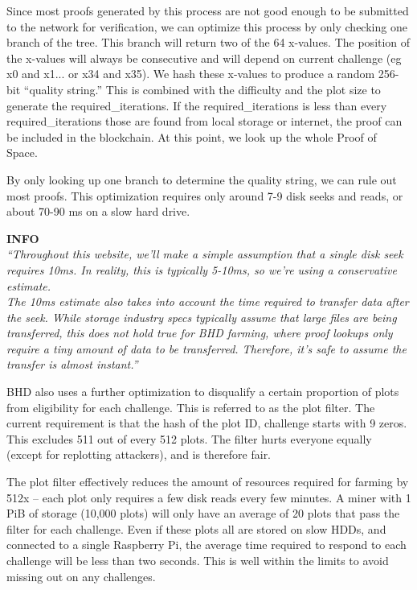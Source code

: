 \begin{flushleft}
    Since most proofs generated by this process are not good enough to be submitted to the network for verification, we can optimize this process by only checking one branch of the tree. This branch will return two of the 64 x-values. The position of the x-values will always be consecutive and will depend on current challenge (eg x0 and x1... or x34 and x35). We hash these x-values to produce a random 256-bit ``quality string.'' This is combined with the difficulty and the plot size to generate the required\_iterations. If the required\_iterations is less than every required\_iterations those are found from local storage or internet, the proof can be included in the blockchain. At this point, we look up the whole Proof of Space.
\end{flushleft}
\begin{flushleft}
    By only looking up one branch to determine the quality string, we can rule out most proofs. This optimization requires only around 7-9 disk seeks and reads, or about 70-90 ms on a slow hard drive.
\end{flushleft}
\begin{flushleft}
    \textbf{INFO}\\[5pt]
    \textit{``Throughout this website, we'll make a simple assumption that a single disk seek requires 10ms. In reality, this is typically 5-10ms, so we're using a conservative estimate.\\[5pt]
    The 10ms estimate also takes into account the time required to transfer data after the seek. While storage industry specs typically assume that large files are being transferred, this does not hold true for BHD farming, where proof lookups only require a tiny amount of data to be transferred. Therefore, it's safe to assume the transfer is almost instant.''}
\end{flushleft}
\begin{flushleft}
    BHD also uses a further optimization to disqualify a certain proportion of plots from eligibility for each challenge. This is referred to as the plot filter. The current requirement is that the hash of the plot ID, challenge starts with 9 zeros. This excludes 511 out of every 512 plots. The filter hurts everyone equally (except for replotting attackers), and is therefore fair.
\end{flushleft}
\begin{flushleft}
    The plot filter effectively reduces the amount of resources required for farming by 512x -- each plot only requires a few disk reads every few minutes. A miner with 1 PiB of storage (10,000 plots) will only have an average of 20 plots that pass the filter for each challenge. Even if these plots all are stored on slow HDDs, and connected to a single Raspberry Pi, the average time required to respond to each challenge will be less than two seconds. This is well within the limits to avoid missing out on any challenges.
\end{flushleft}
